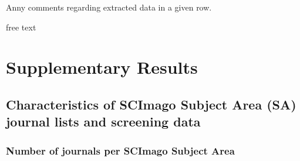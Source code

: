 \documentclass[
]{article}
\newenvironment{Shaded}{\begin{snugshade}}{\end{snugshade}}
\newcommand{\AttributeTok}[1]{\textcolor[rgb]{0.77,0.63,0.00}{#1}}
\newcommand{\CommentTok}[1]{\textcolor[rgb]{0.56,0.35,0.01}{\textit{#1}}}
\newcommand{\DocumentationTok}[1]{\textcolor[rgb]{0.56,0.35,0.01}{\textbf{\textit{#1}}}}
\newcommand{\FloatTok}[1]{\textcolor[rgb]{0.00,0.00,0.81}{#1}}
\newcommand{\FunctionTok}[1]{\textcolor[rgb]{0.00,0.00,0.00}{#1}}
\newcommand{\NormalTok}[1]{#1}
\newcommand{\SpecialCharTok}[1]{\textcolor[rgb]{0.00,0.00,0.00}{#1}}
\newcommand{\StringTok}[1]{\textcolor[rgb]{0.31,0.60,0.02}{#1}}
\begin{document}
Anny comments regarding extracted data in a given row.

free text

\hypertarget{supplementary-results}{%
\section{Supplementary Results}\label{supplementary-results}}

\hypertarget{characteristics-of-scimago-subject-area-sa-journal-lists-and-screening-data}{%
\subsection{Characteristics of SCImago Subject Area (SA) journal lists
and screening
data}\label{characteristics-of-scimago-subject-area-sa-journal-lists-and-screening-data}}

\hypertarget{number-of-journals-per-scimago-subject-area}{%
\subsubsection{Number of journals per SCImago Subject
Area}\label{number-of-journals-per-scimago-subject-area}}

\begin{Shaded}
\end{Shaded}
\end{document}
